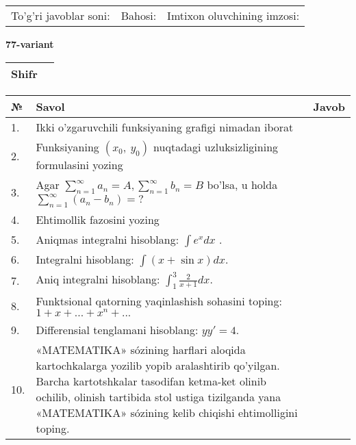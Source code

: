 \documentclass{article}
\begin{document}
  \vspace{1cm}
  
  \begin{tabular}{lll}
  To'g'ri javoblar soni: \underline{\hspace{1.5cm}} & 
  Bahosi: \underline{\hspace{1.5cm}} & 
  Imtixon oluvchining imzosi: \underline{\hspace{2cm}} \\
  \end{tabular}
  
  \egroup
  
  \newpage
  
  
  \textbf{77-variant}\\
  
  \bgroup
  \def\arraystretch{1.6} %
  
  \begin{tabular}{|m{5.7cm}|m{9.5cm}|}
  \hline
  Shifr & \\
  \hline
  \end{tabular}
  
  \vspace{1cm}
  
  \begin{tabular}{|m{0.7cm}|m{10cm}|m{4cm}|}
  \hline
  № & Savol & Javob \\
  \hline
  1. & Ikki o'zgaruvchili funksiyaning grafigi nimadan iborat &  \\
  \hline
  2. & Funksiyaning \((x_{0},\ y_{0})\) nuqtadagi uzluksizligining formulasini yozing &  \\
  \hline
  3. & Agar \(\sum_{n = 1}^{\infty}a_{n} = A,\sum_{n = 1}^{\infty}b_{n} = B\) bo'lsa, u holda \(\sum_{n = 1}^{\infty}\left( a_{n} - b_{n} \right) = ?\) &  \\
  \hline
  4. & Ehtimollik fazosini yozing &  \\
  \hline
  5. & Aniqmas integralni hisoblang: \(\int {e^{x}dx}\) . &  \\
  \hline
  6. & Integralni hisoblang: \(\int {(x + \sin x)dx}\). &  \\
  \hline
  7. & Aniq integralni hisoblang: \(\int_{1}^{3}\frac{2}{x + 1}dx\). &  \\
  \hline
  8. & Funktsional qatorning yaqinlashish sohasini toping:\(1 + x + ... + x^{n} + ...\) &  \\
  \hline
  9. & Differensial tenglamani hisoblang: \(yy' = 4\). &  \\
  \hline
  10. & «MATEMATIKA» sózining harflari aloqida kartochkalarga yozilib yopib aralashtirib qo'yilgan. Barcha kartotshkalar tasodifan ketma-ket olinib ochilib, olinish tartibida stol ustiga tizilganda yana «MATEMATIKA» sózining kelib chiqishi ehtimolligini toping. &  \\
  \hline
  \end{tabular}
  
\end{document}
